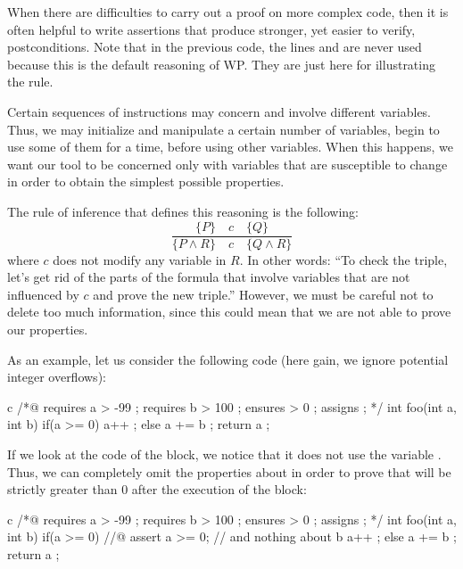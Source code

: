 When there are difficulties to carry out a proof on more complex code,
then it is often helpful to write assertions that produce stronger, yet
easier to verify, postconditions. Note that in the previous code, the
lines  and are never used
because this is the default reasoning of WP. They are just here for
illustrating the rule.


\label{l3:statements-basic-constancy}


Certain sequences of instructions may concern and involve different
variables. Thus, we may initialize and manipulate a certain number of
variables, begin to use some of them for a time, before using other
variables. When this happens, we want our tool to be concerned only with
variables that are susceptible to change in order to obtain the simplest
possible properties.



The rule of inference that defines this reasoning is the following:
$$\dfrac{\{P\}\quad c\quad \{Q\}}{\{P \wedge R\}\quad c\quad \{Q \wedge R\}}$$
where $c$ does not modify any variable in $R$. In other words:
``To check the triple, let's get rid of the parts of the formula that
involve variables that are not influenced by $c$ and prove the new
triple.'' However, we must be careful not to delete too much
information, since this could mean that we are not able to prove our
properties.


As an example, let us consider the following code (here gain, we ignore
potential integer overflows):



\begin{CodeBlock}{c}
/*@
  requires a > -99 ;
  requires b > 100 ;
  ensures  \result > 0 ;
  assigns  \nothing ;
*/
int foo(int a, int b){
  if(a >= 0){
    a++ ;
  } else {
    a += b ;
  }
  return a ;
}
\end{CodeBlock}


If we look at the code of the  block, we notice that it does
not use the variable . Thus, we can completely omit the
properties about  in order to prove that  will be
strictly greater than 0 after the execution of the block:



\begin{CodeBlock}{c}
/*@
  requires a > -99 ;
  requires b > 100 ;
  ensures  \result > 0 ;
  assigns  \nothing ;
*/
int foo(int a, int b){
  if(a >= 0){
    //@ assert a >= 0; // and nothing about b
    a++ ;
  } else {
    a += b ;
  }
  return a ;
}
\end{CodeBlock}




